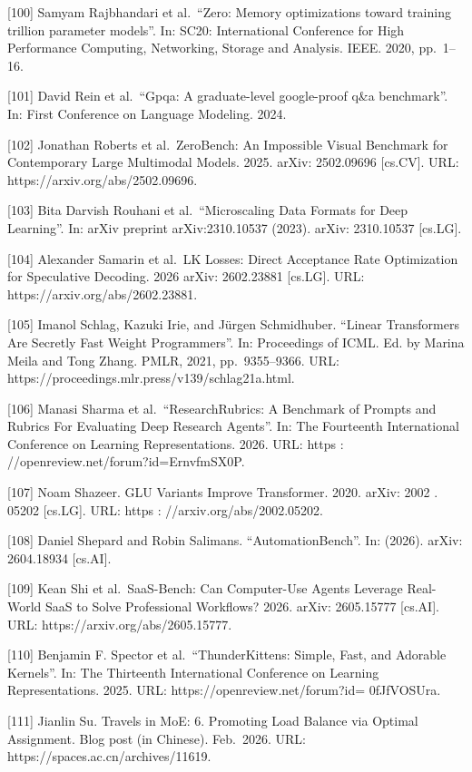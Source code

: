 {[}100{]} Samyam Rajbhandari et al.~``Zero: Memory optimizations toward
training trillion parameter models''. In: SC20: International Conference
for High Performance Computing, Networking, Storage and Analysis. IEEE.
2020, pp.~1--16.

{[}101{]} David Rein et al.~``Gpqa: A graduate-level google-proof q\&a
benchmark''. In: First Conference on Language Modeling. 2024.

{[}102{]} Jonathan Roberts et al.~ZeroBench: An Impossible Visual
Benchmark for Contemporary Large Multimodal Models. 2025. arXiv:
2502.09696 {[}cs.CV{]}. URL: https://arxiv.org/abs/2502.09696.

{[}103{]} Bita Darvish Rouhani et al.~``Microscaling Data Formats for
Deep Learning''. In: arXiv preprint arXiv:2310.10537 (2023). arXiv:
2310.10537 {[}cs.LG{]}.

{[}104{]} Alexander Samarin et al.~LK Losses: Direct Acceptance Rate
Optimization for Speculative Decoding. 2026 arXiv: 2602.23881
{[}cs.LG{]}. URL: https://arxiv.org/abs/2602.23881.

{[}105{]} Imanol Schlag, Kazuki Irie, and Jürgen Schmidhuber. ``Linear
Transformers Are Secretly Fast Weight Programmers''. In: Proceedings of
ICML. Ed. by Marina Meila and Tong Zhang. PMLR, 2021, pp.~9355--9366.
URL: https://proceedings.mlr.press/v139/schlag21a.html.

{[}106{]} Manasi Sharma et al.~``ResearchRubrics: A Benchmark of Prompts
and Rubrics For Evaluating Deep Research Agents''. In: The Fourteenth
International Conference on Learning Representations. 2026. URL: https :
//openreview.net/forum?id=ErnvfmSX0P.

{[}107{]} Noam Shazeer. GLU Variants Improve Transformer. 2020. arXiv:
2002 . 05202 {[}cs.LG{]}. URL: https : //arxiv.org/abs/2002.05202.

{[}108{]} Daniel Shepard and Robin Salimans. ``AutomationBench''. In:
(2026). arXiv: 2604.18934 {[}cs.AI{]}.

{[}109{]} Kean Shi et al.~SaaS-Bench: Can Computer-Use Agents Leverage
Real-World SaaS to Solve Professional Workflows? 2026. arXiv: 2605.15777
{[}cs.AI{]}. URL: https://arxiv.org/abs/2605.15777.

{[}110{]} Benjamin F. Spector et al.~``ThunderKittens: Simple, Fast, and
Adorable Kernels''. In: The Thirteenth International Conference on
Learning Representations. 2025. URL: https://openreview.net/forum?id=
0fJfVOSUra.

{[}111{]} Jianlin Su. Travels in MoE: 6. Promoting Load Balance via
Optimal Assignment. Blog post (in Chinese). Feb.~2026. URL:
https://spaces.ac.cn/archives/11619.


